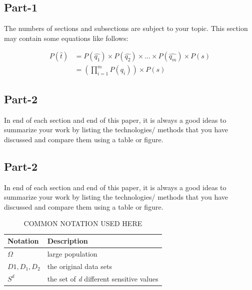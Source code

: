 \documentclass[preprint,11pt]{elsarticle}
\begin{document}
	\subsection{Part-1}
	The numbers of sections and subsections are subject to your topic. This section may contain some equations like follows:
	
	\begin{align}
	P(\hat{t}) &= P(\hat{q_1})\times P(\hat{q_{2}})\times ...\times P(\hat{q_{m}})\times P(s) \nonumber \\
	&= (\prod_{i=1}^{m} P(\hat{q_{i}}))\times P(s)
	\end{align}
	
	\subsection{Part-2}
	In end of each section and end of this paper, it is always a
	good ideas to summarize your work by listing the technologies/
	methods that you have discussed and compare them using
	a table or figure.
	\subsection{Part-2}
	In end of each section and end of this paper, it is always a
	good ideas to summarize your work by listing the technologies/
	methods that you have discussed and compare them using
	a table or figure.
	
	\begin{table}[h]
		\begin{center}
			\caption{COMMON NOTATION USED HERE}
			\label{notation}
			\begin{tabular}{ |l|l| } 
				\hline
				\textbf{Notation} & \textbf{Description}  \\ 
				\hline
				$\Omega$ & large population \\
				\hline 
				$D1, D_{1}, D_{2}$ & the original data sets\\
				\hline
				$ S^{d} $ & the set of \textit{d} different sensitive values\\
				\hline
				
			\end{tabular}
		\end{center}
	\end{table}
	\vfill
	
	\newpage
\end{document}
